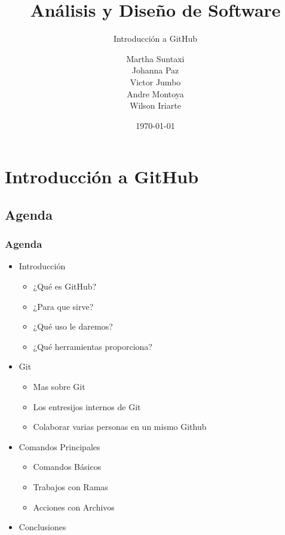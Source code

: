 \documentclass{beamer}
\title{Análisis y Diseño de Software}
\subtitle{Introducción a GitHub}
\author[Grupo1]{
Martha Suntaxi\\Johanna Paz\\Victor Jumbo\\Andre Montoya\\Wilson Iriarte
}
\date{\today}
\institute{Ingeniería en Sistemas\\}
\begin{document}
	
	\begin{frame}[plain,t]
		\titlepage
	\end{frame}

	\section{Introducción a GitHub}

\subsection{Agenda}
\begin{frame}
\frametitle{Agenda}
{\small
\begin{itemize}
\item Introducción
	\begin{itemize}
	\item ¿Qué es GitHub?
	\item ¿Para que sirve?
	\item ¿Qué uso le daremos?
	\item ¿Qué herramientas proporciona?
	\end{itemize}
\item Git
	\begin{itemize}
	\item Mas sobre Git
	\item Los entresijos internos de Git
	\item Colaborar varias personas en un mismo Github
	\end{itemize}
\item Comandos Principales
	\begin{itemize}
	\item Comandos Básicos
	\item Trabajos con Ramas
	\item Acciones con Archivos
	\end{itemize}
\item Conclusiones
\end{itemize}}
\end{frame}
\end{document}
